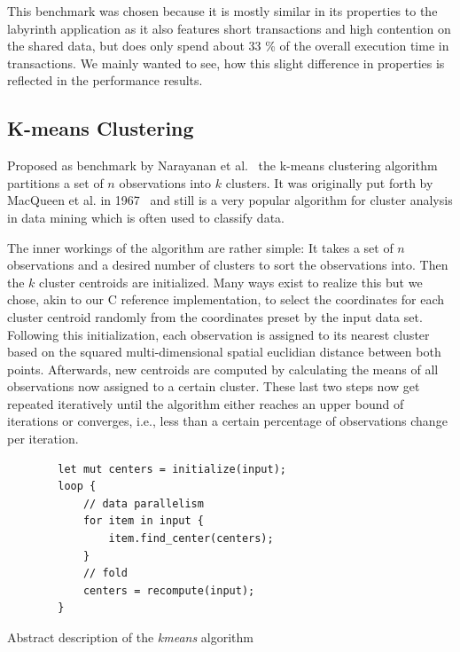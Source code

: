 This benchmark was chosen because it is mostly similar in its properties to the labyrinth application as it also features short transactions and high contention on the shared data, but does only spend about 33 \% of the overall execution time in transactions.
We mainly wanted to see, how this slight difference in properties is reflected in the performance results.


\subsection{K-means Clustering}
\label{sec:experiments:kmeans}

Proposed as benchmark by Narayanan et al.~\cite{narayanan2006minebench} the k-means clustering algorithm partitions a set of $n$ observations into $k$ clusters.
It was originally put forth by MacQueen et al. in 1967~\cite{macqueen1967some} and still is a very popular algorithm for cluster analysis in data mining which is often used to classify data.

The inner workings of the algorithm are rather simple: It takes a set of $n$ observations and a desired number of clusters to sort the observations into.
Then the $k$ cluster centroids are initialized.
Many ways exist to realize this but we chose, akin to our C reference implementation, to select the coordinates for each cluster centroid randomly from the coordinates preset by the input data set.
Following this initialization, each observation is assigned to its nearest cluster based on the squared multi-dimensional spatial euclidian distance between both points.
Afterwards, new centroids are computed by calculating the means of all observations now assigned to a certain cluster.
These last two steps now get repeated iteratively until the algorithm either reaches an upper bound of iterations or converges, i.e., less than a certain percentage of observations change per iteration.

\begin{listing}
    \begin{verbatim}
        let mut centers = initialize(input);
        loop {
            // data parallelism
            for item in input {
                item.find_center(centers);
            }
            // fold
            centers = recompute(input);
        }
    \end{verbatim}
    \caption{Abstract description of the \emph{kmeans} algorithm}
    \label{fig:experiments:opportunities:algos:kmeans}
\end{listing}

